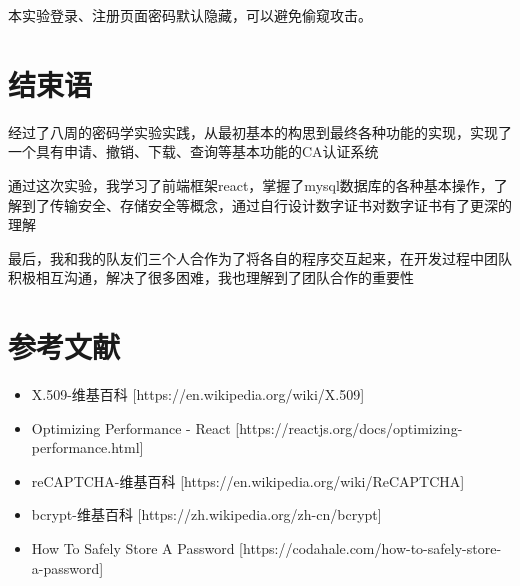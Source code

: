 \documentclass{ctexart}
\begin{document}
本实验登录、注册页面密码默认隐藏，可以避免偷窥攻击。

\section{结束语}
经过了八周的密码学实验实践，从最初基本的构思到最终各种功能的实现，实现了一个具有申请、撤销、下载、查询等基本功能的CA认证系统

通过这次实验，我学习了前端框架react，掌握了mysql数据库的各种基本操作，了解到了传输安全、存储安全等概念，通过自行设计数字证书对数字证书有了更深的理解

最后，我和我的队友们三个人合作为了将各自的程序交互起来，在开发过程中团队积极相互沟通，解决了很多困难，我也理解到了团队合作的重要性


\section{参考文献}
\begin{itemize}
    \item X.509-维基百科 [https://en.wikipedia.org/wiki/X.509]
    \item Optimizing Performance - React [https://reactjs.org/docs/optimizing-performance.html]
    \item reCAPTCHA-维基百科 [https://en.wikipedia.org/wiki/ReCAPTCHA]
    \item bcrypt-维基百科 [https://zh.wikipedia.org/zh-cn/bcrypt]
    \item How To Safely Store A Password [https://codahale.com/how-to-safely-store-a-password]
\end{itemize}
\end{document}
